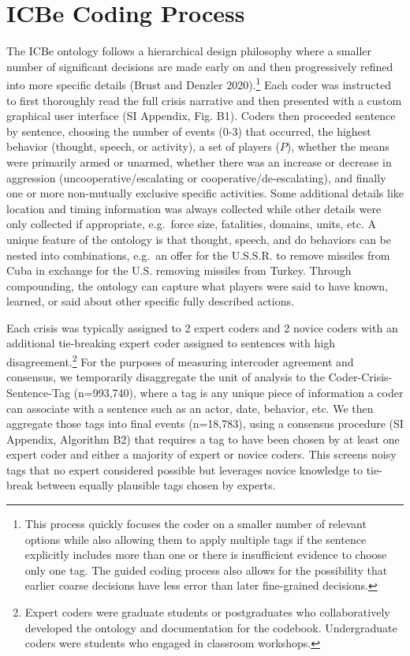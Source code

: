 \documentclass{article}
\begin{document}
\clearpage

\hypertarget{icbe-coding-process}{%
\section{ICBe Coding Process}\label{icbe-coding-process}}

The ICBe ontology follows a hierarchical design philosophy where a
smaller number of significant decisions are made early on and then
progressively refined into more specific details (Brust and Denzler
2020).\footnote{This process quickly focuses the coder on a smaller
  number of relevant options while also allowing them to apply multiple
  tags if the sentence explicitly includes more than one or there is
  insufficient evidence to choose only one tag. The guided coding
  process also allows for the possibility that earlier coarse decisions
  have less error than later fine-grained decisions.} Each coder was
instructed to first thoroughly read the full crisis narrative and then
presented with a custom graphical user interface (SI Appendix, Fig. B1).
Coders then proceeded sentence by sentence, choosing the number of
events (0-3) that occurred, the highest behavior (thought, speech, or
activity), a set of players (\(P\)), whether the means were primarily
armed or unarmed, whether there was an increase or decrease in
aggression (uncooperative/escalating or cooperative/de-escalating), and
finally one or more non-mutually exclusive specific activities. Some
additional details like location and timing information was always
collected while other details were only collected if appropriate,
e.g.~force size, fatalities, domains, units, etc. A unique feature of
the ontology is that thought, speech, and do behaviors can be nested
into combinations, e.g.~an offer for the U.S.S.R. to remove missiles
from Cuba in exchange for the U.S. removing missiles from Turkey.
Through compounding, the ontology can capture what players were said to
have known, learned, or said about other specific fully described
actions.

Each crisis was typically assigned to 2 expert coders and 2 novice
coders with an additional tie-breaking expert coder assigned to
sentences with high disagreement.\footnote{Expert coders were graduate
  students or postgraduates who collaboratively developed the ontology
  and documentation for the codebook. Undergraduate coders were students
  who engaged in classroom workshops.} For the purposes of measuring
intercoder agreement and consensus, we temporarily disaggregate the unit
of analysis to the Coder-Crisis-Sentence-Tag (n=993,740), where a tag is
any unique piece of information a coder can associate with a sentence
such as an actor, date, behavior, etc. We then aggregate those tags into
final events (n=18,783), using a consensus procedure (SI Appendix,
Algorithm B2) that requires a tag to have been chosen by at least one
expert coder and either a majority of expert or novice coders. This
screens noisy tags that no expert considered possible but leverages
novice knowledge to tie-break between equally plausible tags chosen by
experts.
\end{document}
